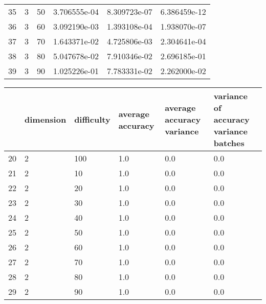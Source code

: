 \documentclass{article}
\begin{document}
\begin{center}
\begin{tabular}{llllll}
35 &         3 &         50 &  3.706555e-04 &          8.309723e-07 &                      6.386459e-12 \\
36 &         3 &         60 &  3.092190e-03 &          1.393108e-04 &                      1.938070e-07 \\
37 &         3 &         70 &  1.643371e-02 &          4.725806e-03 &                      2.304641e-04 \\
38 &         3 &         80 &  5.047678e-02 &          7.910346e-02 &                      2.696185e-01 \\
39 &         3 &         90 &  1.025226e-01 &          7.783331e-02 &                      2.262000e-02 \\
\bottomrule
\end{tabular}
\end{center}
\begin{center}
\begin{tabular}{llllll}
\toprule
{} & dimension & difficulty & average accuracy & average accuracy variance & variance of accuracy variance batches \\
\midrule
20 &         2 &        100 &              1.0 &                       0.0 &                                   0.0 \\
21 &         2 &         10 &              1.0 &                       0.0 &                                   0.0 \\
22 &         2 &         20 &              1.0 &                       0.0 &                                   0.0 \\
23 &         2 &         30 &              1.0 &                       0.0 &                                   0.0 \\
24 &         2 &         40 &              1.0 &                       0.0 &                                   0.0 \\
25 &         2 &         50 &              1.0 &                       0.0 &                                   0.0 \\
26 &         2 &         60 &              1.0 &                       0.0 &                                   0.0 \\
27 &         2 &         70 &              1.0 &                       0.0 &                                   0.0 \\
28 &         2 &         80 &              1.0 &                       0.0 &                                   0.0 \\
29 &         2 &         90 &              1.0 &                       0.0 &                                   0.0 \\

\end{tabular}
\end{center}
\end{document}
